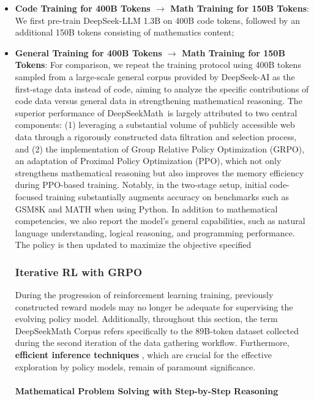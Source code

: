 \begin{itemize}[topsep=0pt]
    \item \textbf{Code Training for 400B Tokens $\rightarrow$ Math Training for 150B Tokens}: We first pre-train DeepSeek-LLM 1.3B on 400B code tokens, followed by an additional 150B tokens consisting of mathematics content;
    \item \textbf{General Training for 400B Tokens $\rightarrow$ Math Training for 150B Tokens}: For comparison, we repeat the training protocol using 400B tokens sampled from a large-scale general corpus provided by DeepSeek-AI as the first-stage data instead of code, aiming to analyze the specific contributions of code data versus general data in strengthening mathematical reasoning. The superior performance of DeepSeekMath~is largely attributed to two central components: (1) leveraging a substantial volume of publicly accessible web data through a rigorously constructed data filtration and selection process, and (2) the implementation of Group Relative Policy Optimization (GRPO), an adaptation of Proximal Policy Optimization (PPO), which not only strengthens mathematical reasoning but also improves the memory efficiency during PPO-based training. Notably, in the two-stage setup, initial code-focused training substantially augments accuracy on benchmarks such as GSM8K and MATH when using Python. In addition to mathematical competencies, we also report the model’s general capabilities, such as natural language understanding, logical reasoning, and programming performance. The policy is then updated to maximize the objective specified

\subsubsection{Iterative RL with GRPO} During the progression of reinforcement learning training, previously constructed reward models may no longer be adequate for supervising the evolving policy model. Additionally, throughout this section, the term DeepSeekMath Corpus refers specifically to the 89B-token dataset collected during the second iteration of the data gathering workflow. Furthermore, \textbf{efficient inference techniques} \citep{xia-etal-2023-speculative,leviathan2023fast,kwon2023efficient,xia2024unlocking}, which are crucial for the effective exploration by policy models, remain of paramount significance. \paragraph{Mathematical Problem Solving with Step-by-Step Reasoning}


\end{itemize}
